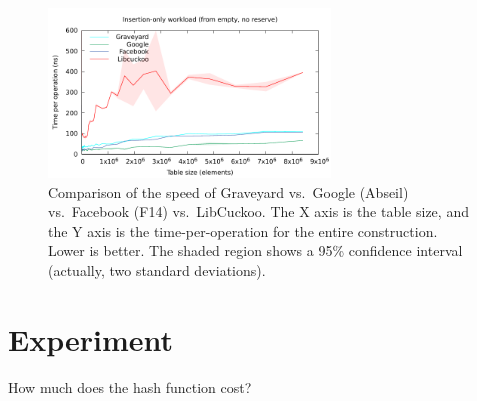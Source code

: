 \documentclass[10pt]{article}
\theoremstyle{remark}
\theoremstyle{remark}
\newcommand{\figlabel}[1]{\label{fig:#1}}
\begin{document}
\begin{figure}
  \begin{center}
  \includegraphics[width=75mm]{experiments/library-insertion}
  \end{center}
\caption{Comparison of the speed of Graveyard vs.~Google (Abseil)
  vs.~Facebook (F14) vs.~LibCuckoo.  The X axis is the table size, and
  the Y axis is the time-per-operation for the entire construction.
  Lower is better.  The shaded region shows a 95\% confidence interval
  (actually, two standard deviations).}
\figlabel{libraries}
\end{figure}

\section{Experiment}

How much does the hash function cost?




\end{document}
